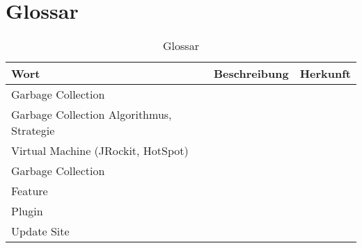 \chapter*{Glossar}\label{glossar}
  \begin{longtable}{|p{3cm}|p{7cm}|p{4cm}|}
      \caption{Glossar}\\
\hline
  \textbf{Wort} & \textbf{Beschreibung} & \textbf{Herkunft}\\\hline
  Garbage Collection & & \\\hline
  Garbage Collection Algorithmus, Strategie & & \\\hline
  Virtual Machine (JRockit, HotSpot) & & \\\hline
  Garbage Collection & & \\\hline
  Feature && \\\hline
  Plugin && \\\hline
  Update Site && \\\hline
  \end{longtable}


